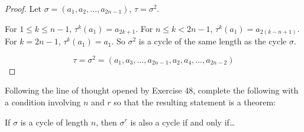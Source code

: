 \begin{proof}
    Let $\sigma = (a_{1}, a_{2}, \ldots, a_{2n-1})$, $\tau = \sigma^{2}$.

    For $1\leq k \leq n-1$, $\tau^{k}(a_{1}) = a_{2k+1}$. For $n\leq k < 2n-1$, $\tau^{k}(a_{1}) = a_{2(k-n+1)}$. For $k = 2n-1$, $\tau^{k}(a_{1}) = a_{1}$. So $\sigma^{2}$ is a cycle of the same length as the cycle $\sigma$.

    \[
        \tau = \sigma^{2} = (a_{1}, a_{3}, \ldots, a_{2n-1}, a_{2}, a_{4}, \ldots, a_{2n-2})
    \]
\end{proof}

\newpage
\begin{exercise}
    Following the line of thought opened by Exercise 48, complete the following with a condition involving $n$ and $r$ so that the resulting statement is a theorem:
    \begin{center}
        If $\sigma$ is a cycle of length $n$, then $\sigma^{r}$ is also a cycle if and only if\ldots
    \end{center}
\end{exercise}

